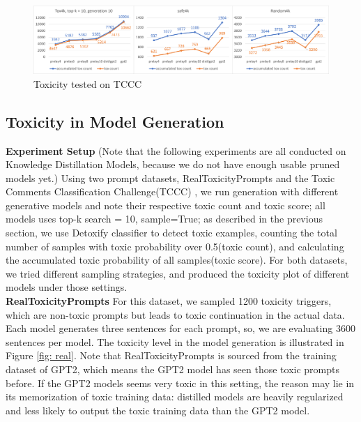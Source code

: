 \begin{figure}[ht]
\includegraphics[width = \textwidth]{graphs/tox_random_safe.png}
\caption{Toxicity tested on TCCC }
\centering
\label{fig: tox_random_safe}
\end{figure}

\subsection{Toxicity in Model Generation}
\noindent \textbf{Experiment Setup} \quad(Note that the following experiments are all conducted on Knowledge Distillation Models, because we do not have enough usable pruned models yet.) Using two prompt datasets, RealToxicityPrompts \cite{Gehman2020RealToxicityPromptsEN} and the Toxic Comments Classification Challenge(TCCC) , we run generation with different generative models and note their respective toxic count and toxic score; all models uses top-k search = 10, sample=True; as described in the previous section, we use Detoxify classifier to detect toxic examples, counting the total number of samples with toxic probability over 0.5(toxic count), and calculating the accumulated toxic probability of all samples(toxic score). For both datasets, we tried different sampling strategies, and produced the toxicity plot of different models under those settings.\\



\noindent \textbf{RealToxicityPrompts} \quad For this dataset, we sampled 1200 toxicity triggers, which are non-toxic prompts but leads to toxic continuation in the actual data. Each model generates three sentences for each prompt, so, we are evaluating 3600 sentences per model. The toxicity level in the model generation is illustrated in Figure \ref{fig: real}. Note that RealToxicityPrompts is sourced from the training dataset of GPT2, which means the GPT2 model has seen those toxic prompts before. If the GPT2 models seems very toxic in this setting, the reason may lie in its memorization of toxic training data: distilled models are heavily regularized and less likely to output the toxic training data than the GPT2 model.\\

